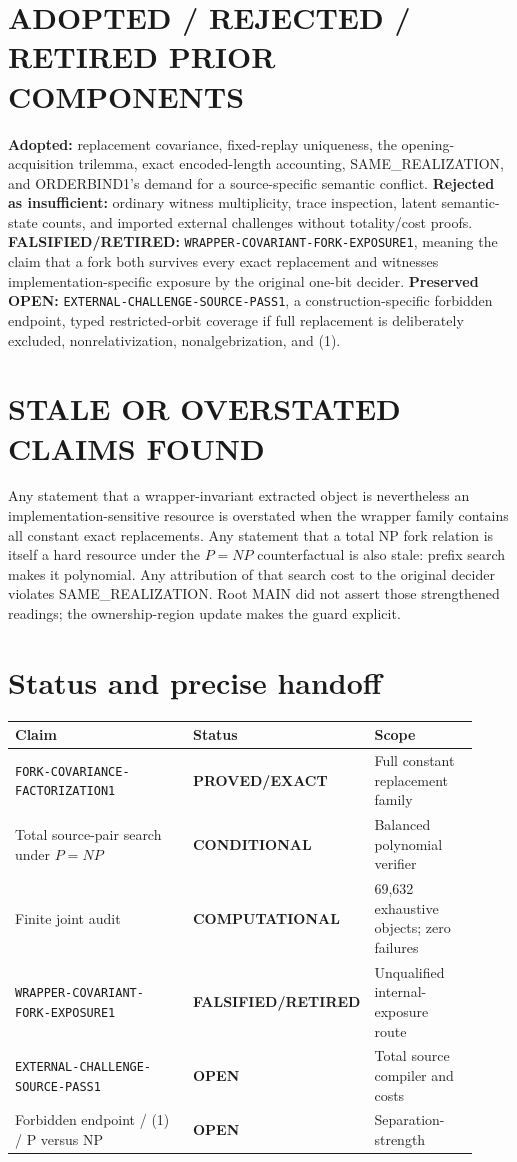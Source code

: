 \documentclass[11pt]{article}
\newcommand{\EXACT}{\textbf{PROVED/EXACT}}
\newcommand{\COMP}{\textbf{COMPUTATIONAL}}
\newcommand{\COND}{\textbf{CONDITIONAL}}
\newcommand{\OPEN}{\textbf{OPEN}}
\newcommand{\RETIRED}{\textbf{FALSIFIED/RETIRED}}
\begin{document}
\section{ADOPTED / REJECTED / RETIRED PRIOR COMPONENTS}

\textbf{Adopted:} replacement covariance, fixed-replay uniqueness, the
opening-acquisition trilemma, exact encoded-length accounting,
SAME\_REALIZATION, and ORDERBIND1's demand for a source-specific semantic
conflict.  \textbf{Rejected as insufficient:} ordinary witness multiplicity,
trace inspection, latent semantic-state counts, and imported external
challenges without totality/cost proofs.  \textbf{FALSIFIED/RETIRED:}
\texttt{WRAPPER-COVARIANT-FORK-EXPOSURE1}, meaning the claim that a fork both
survives every exact replacement and witnesses implementation-specific
exposure by the original one-bit decider.  \textbf{Preserved OPEN:}
\texttt{EXTERNAL-CHALLENGE-SOURCE-PASS1}, a construction-specific forbidden
endpoint, typed restricted-orbit coverage if full replacement is deliberately
excluded, nonrelativization, nonalgebrization, and (1).

\section{STALE OR OVERSTATED CLAIMS FOUND}

Any statement that a wrapper-invariant extracted object is nevertheless an
implementation-sensitive resource is overstated when the wrapper family
contains all constant exact replacements.  Any statement that a total NP
fork relation is itself a hard resource under the $P=NP$ counterfactual is
also stale: prefix search makes it polynomial.  Any attribution of that
search cost to the original decider violates SAME\_REALIZATION.  Root MAIN
did not assert those strengthened readings; the ownership-region update
makes the guard explicit.

\section{Status and precise handoff}

\begin{center}\small
\begin{tabular}{p{0.48\linewidth}p{0.19\linewidth}p{0.25\linewidth}}
\toprule
Claim & Status & Scope\\ \midrule
\texttt{FORK-COVARIANCE-FACTORIZATION1} & \EXACT & Full constant replacement family\\
Total source-pair search under $P=NP$ & \COND & Balanced polynomial verifier\\
Finite joint audit & \COMP & 69,632 exhaustive objects; zero failures\\
\texttt{WRAPPER-COVARIANT-FORK-EXPOSURE1} & \RETIRED & Unqualified internal-exposure route\\
\texttt{EXTERNAL-CHALLENGE-SOURCE-PASS1} & \OPEN & Total source compiler and costs\\
Forbidden endpoint / (1) / P versus NP & \OPEN & Separation-strength\\
\bottomrule
\end{tabular}
\end{center}
\end{document}
